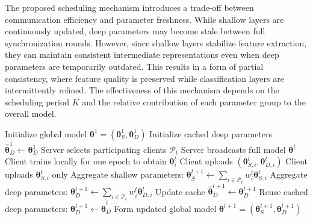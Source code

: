 \documentclass[10pt,conference]{IEEEtran}
\begin{document}
\noindent
The proposed scheduling mechanism introduces a trade-off between communication efficiency and parameter freshness. While shallow layers are continuously updated, deep parameters may become stale between full synchronization rounds. However, since shallow layers stabilize feature extraction, they can maintain consistent intermediate representations even when deep parameters are temporarily outdated. This results in a form of partial consistency, where feature quality is preserved while classification layers are intermittently refined. The effectiveness of this mechanism depends on the scheduling period $K$ and the relative contribution of each parameter group to the overall model. %

\begin{algorithm}[t]
\caption{Periodic Asynchronous Layer-Wise FL}
\label{alg:async_layerwise}
\begin{algorithmic}[1]
\State Initialize global model $\boldsymbol{\theta}^{1}=(\boldsymbol{\theta}_{S}^{1},\boldsymbol{\theta}_{D}^{1})$
\State Initialize cached deep parameters $\widehat{\boldsymbol{\theta}}_{D}^{1}\gets\boldsymbol{\theta}_{D}^{1}$
    \State Server selects participating clients $\mathcal{P}_{t}$
    \State Server broadcasts full model $\boldsymbol{\theta}^{t}$
        \State Client trains locally for one epoch to obtain $\boldsymbol{\theta}_{i}^{t}$
            \State Client uploads $(\boldsymbol{\theta}_{S,i}^{t},\boldsymbol{\theta}_{D,i}^{t})$
        \Else
            \State Client uploads $\boldsymbol{\theta}_{S,i}^{t}$ only
        \EndIf
    \EndFor
    \State Aggregate shallow parameters:
    \Statex \hspace{\algorithmicindent}$\boldsymbol{\theta}_{S}^{t+1}\gets
    \sum_{i\in\mathcal{P}_{t}} w_i^t \boldsymbol{\theta}_{S,i}^{t}$
        \State Aggregate deep parameters:
        \Statex \hspace{\algorithmicindent}$\boldsymbol{\theta}_{D}^{t+1}\gets
        \sum_{i\in\mathcal{P}_{t}} w_i^t \boldsymbol{\theta}_{D,i}^{t}$
        \State Update cache $\widehat{\boldsymbol{\theta}}_{D}^{t+1}\gets\boldsymbol{\theta}_{D}^{t+1}$
    \Else
        \State Reuse cached deep parameters:
        \Statex \hspace{\algorithmicindent}$\boldsymbol{\theta}_{D}^{t+1}\gets\widehat{\boldsymbol{\theta}}_{D}^{t}$
    \EndIf
    \State Form updated global model $\boldsymbol{\theta}^{t+1}=(\boldsymbol{\theta}_{S}^{t+1},\boldsymbol{\theta}_{D}^{t+1})$
\EndFor
\end{algorithmic}
\end{algorithm}
\end{document}
